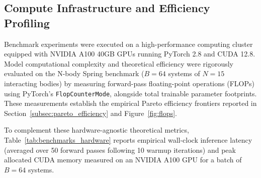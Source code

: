 \documentclass[10pt]{article}
\begin{document}
\subsection{Compute Infrastructure and Efficiency Profiling}
\label{app:compute}

Benchmark experiments were executed on a high-performance computing cluster equipped with NVIDIA A100 40GB GPUs running PyTorch 2.8 and CUDA 12.8.
Model computational complexity and theoretical efficiency were rigorously evaluated on the N-body Spring benchmark ($B=64$ systems of $N=15$ interacting bodies) by measuring forward-pass floating-point operations (FLOPs) using PyTorch's \texttt{FlopCounterMode}, alongside total trainable parameter footprints. These measurements establish the empirical Pareto efficiency frontiers reported in Section~\ref{subsec:pareto_efficiency} and Figure~\ref{fig:flops}.

To complement these hardware-agnostic theoretical metrics, Table~\ref{tab:benchmarks_hardware} reports empirical wall-clock inference latency (averaged over 50 forward passes following 10 warmup iterations) and peak allocated CUDA memory measured on an NVIDIA A100 GPU for a batch of $B=64$ systems.

\begin{table}[!ht]
\centering
\caption{Comprehensive computational efficiency and generalization benchmark on the N-body Spring system ($B=64$, $N=15$, 100 training examples). Latency and peak memory figures were profiled on an NVIDIA A100 GPU under PyTorch 2.8. Metrics report mean $\pm$ standard deviation across evaluation runs.}
\label{tab:benchmarks_hardware}
\end{table}
\end{document}
